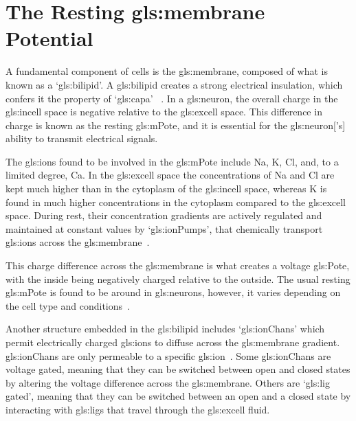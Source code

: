 \documentclass[../../Orator]{subfiles}
\begin{document}
\section{The Resting \gls{gls:membrane} Potential} 
A fundamental component of cells is the \gls{gls:membrane}, composed of what is known as a `\gls{gls:bilipid}'\footnotemark. A \gls{gls:bilipid} creates a strong electrical insulation, 
which confers it the property of `\gls{gls:capa}'~\cite{}
.  
In a \gls{gls:neuron}, the overall charge in the \gls{gls:incell} space is negative relative to the \gls{gls:excell} space. 
This difference in charge is known as the resting \gls{gls:mPote}, and it is essential for the \gls{gls:neuron}['s] ability to transmit electrical signals. 


The \glspl{gls:ion} found to be involved in the \gls{gls:mPote} include \gls{Na}, \gls{K}, \gls{Cl}, and, to a limited degree, \gls{Ca}. 
In the \gls{gls:excell} space the concentrations of \gls{Na} and  \gls{Cl} are kept much higher than in the cytoplasm of the \gls{gls:incell} space, whereas \gls{K} is found in much higher concentrations in the cytoplasm compared to the \gls{gls:excell} space. 
During rest, their concentration gradients are actively regulated and maintained at constant values by `\glspl{gls:ionPump}', that chemically transport \glspl{gls:ion} across the \gls{gls:membrane}~\cite{}. 

This charge difference across the \gls{gls:membrane} is what creates a voltage \gls{gls:Pote}, with the inside being negatively charged relative to the outside. The usual resting \gls{gls:mPote} is found to be around  in \glspl{gls:neuron}, however, it varies depending on the cell type and conditions~\cite{}. 

Another structure embedded in the \gls{gls:bilipid} includes `\glspl{gls:ionChan}' which permit electrically charged \glspl{gls:ion} to diffuse across the \gls{gls:membrane} gradient. \Glspl{gls:ionChan} are only permeable to a specific \gls{gls:ion}~\cite{}. Some \glspl{gls:ionChan} are voltage gated, meaning that they can be switched between open and closed states by altering the voltage difference across the \gls{gls:membrane}. 
Others are `\gls{gls:lig} gated', meaning that they can be switched between an open and a closed state by interacting with \glspl{gls:lig} that travel through the \gls{gls:excell} fluid. 
\end{document}
